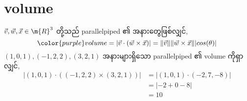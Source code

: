 \section{volume}
$\vec{v},\vec{w},\vec{x}\in\m{R}^3$ တို့သည် parallelpiped ၏ အနားတွေဖြစ်လျှင်,
\begin{equation}
        {\color{purple}
        volume=|\vec{v}\cdot(\vec{w}\times\vec{x})|=\|\vec{v}\|\|\vec{w}\times\vec{x}\||cos(\theta)|
        }
\end{equation}
$(1,0,1),(-1,2,2),(3,2,1)$ အနားများရှိသော parallelpiped ၏ volume ကိုရှာလျှင်,
\[
\begin{split}
    |(1,0,1)\cdot((-1,2,2)\times(3,2,1))|&=|(1,0,1)\cdot(-2,7,-8)| \\
    &=|-2+0-8| \\
    &=10
\end{split}
\]